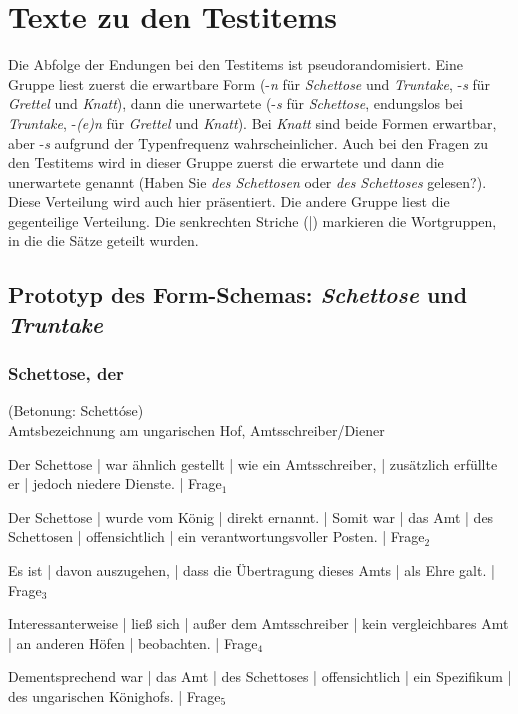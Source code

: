 \section{Texte zu den Testitems}
\label{testitemself}

Die Abfolge der Endungen bei den Testitems ist pseudorandomisiert. Eine Gruppe liest zuerst die erwartbare Form (-\textit{n} für \textit{Schettose} und \textit{Truntake}, -\textit{s} für \textit{Grettel} und \textit{Knatt}), dann die unerwartete (-\textit{s} für \textit{Schettose}, endungslos bei \textit{Truntake}, -\textit{(e)n} für \textit{Grettel} und \textit{Knatt}). Bei \textit{Knatt} sind beide Formen erwartbar, aber -\textit{s} aufgrund der Typenfrequenz wahrscheinlicher. Auch bei den Fragen zu den Testitems wird in dieser Gruppe zuerst die erwartete und dann die unerwartete genannt (Haben Sie \textit{des Schettosen} oder \textit{des Schettoses} gelesen?). Diese Verteilung wird auch hier präsentiert. Die andere Gruppe liest die gegenteilige Verteilung. Die senkrechten Striche (|) markieren die Wortgruppen, in die die Sätze geteilt wurden.\largerpage[-1]

\subsection{Prototyp des Form-Schemas: \textit{Schettose} und \textit{Truntake}}

\subsubsection*{Schettose, der}
(Betonung: Schettóse) \\
Amtsbezeichnung am ungarischen Hof, Amtsschreiber/Diener
\begin{SchmittAppendixList}
\item Der Schettose | war ähnlich gestellt | wie ein Amtsschreiber, | zusätzlich erfüllte er | jedoch niedere Dienste. | Frage$_1$ 
\item Der Schettose | wurde vom König | direkt ernannt. | Somit war | das Amt | des Schettosen | offensichtlich | ein verantwortungsvoller Posten. | Frage$_2$
\item Es ist | davon auszugehen, | dass die Übertragung dieses Amts | als Ehre galt. | Frage$_3$ 
\item Interessanterweise | ließ sich | außer dem Amtsschreiber | kein vergleichbares Amt | an anderen Höfen | beobachten. | Frage$_4$ 
\item Dementsprechend war | das Amt | des Schettoses | offensichtlich | ein Spezifikum | des ungarischen Könighofs. | Frage$_5$ 
\end{SchmittAppendixList}

